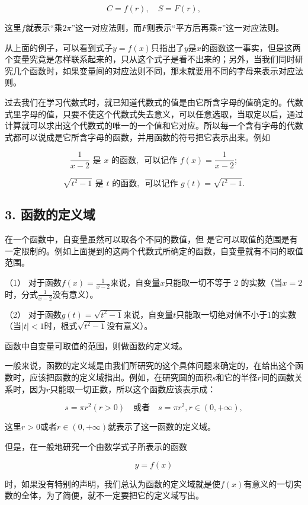 \[
C = f (r), \quad S = F (r),
\]

这里\(f\)就表示``乘\(2\pi\)''这一对应法则，而\(F\)则表示``平方后再乘\(\pi\)''这一对应法则。

从上面的例子，可以看到式子\(y = f(x)\)只指出了\(y\)是\(x\)的函数这一事实，但是这两个变量究竟是怎样联系起来的，只从这个式子是看不出来的；另外，当我们同时研究几个函数时，如果变量间的对应法则不同，那末就要用不同的字母来表示对应法则。

过去我们在学习代数式时，就已知道代数式的值是由它所含字母的值确定的。代数式里字母的值，只要不使这个代数式失去意义，可以任意选取，当取定以后，通过计算就可以求出这个代数式的唯一的一个值和它对应。所以每一个含有字母的代数式都可以说成是它所含字母的函数，并用函数的符号把它表示出来。例如

\[
\frac{1}{x - 2} \text{ 是 } x \text{ 的函数, } \text{ 可以记作 } f (x) = \frac{1}{x - 2};
\]

\[
\sqrt{t^{2} - 1} \text{ 是 } t \text{ 的函数, } \text{ 可以记作 } g (t) = \sqrt{t^{2} - 1}.
\]

\subsection{3. 函数的定义域}

在一个函数中，自变量虽然可以取各个不同的数值，但
是它可以取值的范围是有一定限制的。例如上面提到的这两个代数式所确定的函数，自变量就有不同的取值范围。

（1）
对于函数\(f(x) = \frac{1}{x - 2}\)来说，自变量\(x\)只能取一切不等于 2
的实数（当\(x = 2\)时，分式\(\frac{1}{x - 2}\)没有意义）。

（2）
对于函数\(g(t) = \sqrt{t^2 - 1}\)来说，自变量\(t\)只能取一切绝对值不小于1的实数（当\(|t| < 1\)时，根式\(\sqrt{t^2 - 1}\)没有意义）。

函数中自变量可取值的范围，则做函数的定义域。

一般来说，函数的定义域是由我们所研究的这个具体问题来确定的，在给出这个函数时，应该把函数的定义域指出。例如，在研究圆的面积\(s\)和它的半径\(r\)间的函数关系时，因为\(r\)只能取一切正数，所以这个函数应该表示成：

\[
s = \pi r^{2} (r > 0) \quad \text{或者} \quad s = \pi r^{2}, r \in (0, + \infty),
\]

这里\(r > 0\)或者\(r \in (0, +\infty)\)就表示了这一函数的定义域。

但是，在一般地研究一个由数学式子所表示的函数

\[
y = f (x)
\]

时，如果没有特别的声明，我们总认为函数的定义域就是使\(f(x)\)有意义的一切实数的全体，为了简便，就不一定要把它的定义域写出。

